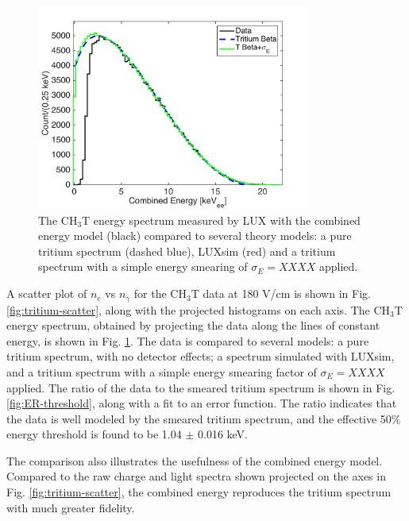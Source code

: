 \begin{figure}[h!]
\begin{center}
\includegraphics[width=90mm]{fig/tritium-spectrum-linear.png}
\caption{The CH$_3$T energy spectrum measured by LUX with the combined energy model (black) compared to several theory models: a pure tritium spectrum (dashed blue), LUXsim (red) and a tritium spectrum with a simple energy smearing of $\sigma_E = XXXX$ applied. }
\label{fig:tritium-spectrum}
\end{center}
\end{figure}



A scatter plot of $n_e$ vs $n_{\gamma}$ for the CH$_3$T data at 180 V/cm is shown in Fig. \ref{fig:tritium-scatter}, along with the projected histograms on each axis. The CH$_3$T energy spectrum, obtained by projecting the data along the lines of constant energy, is shown in Fig. \ref{fig:tritium-spectrum}. The data is compared to several models: a pure tritium spectrum, with no detector effects; a spectrum simulated with LUXsim, and a tritium spectrum with a simple energy smearing factor of $\sigma_E = XXXX$ applied. The ratio of the data to the smeared tritium spectrum is shown in Fig. \ref{fig:ER-threshold}, along with a fit to an error function. The ratio indicates that the data is well modeled by the smeared tritium spectrum, and the effective 50\% energy threshold is found to be 1.04 $\pm$ 0.016 keV. 

The comparison also illustrates the usefulness of the combined energy model. Compared to the raw charge and light spectra shown projected on the axes in Fig. \ref{fig:tritium-scatter}, the combined energy reproduces the tritium spectrum with much greater fidelity.

